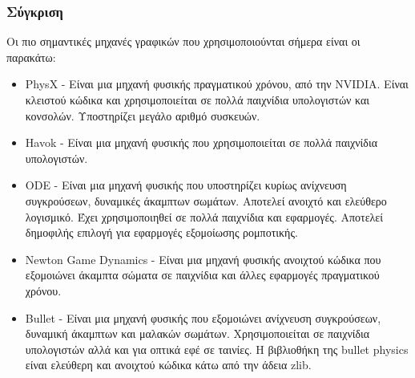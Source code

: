 \subsubsection{Σύγκριση}
Οι πιο σημαντικές μηχανές γραφικών που χρησιμοποιούνται σήμερα είναι οι παρακάτω:
\begin{itemize}
\item PhysX - Είναι μια μηχανή φυσικής πραγματικού χρόνου, από την NVIDIA. Είναι κλειστού κώδικα και χρησιμοποιείται σε πολλά παιχνίδια υπολογιστών και κονσολών. Υποστηρίζει μεγάλο αριθμό συσκευών.
\item Havok - Είναι μια μηχανή φυσικής που χρησιμοποιείται σε πολλά παιχνίδια υπολογιστών. 
\item ODE - Είναι μια μηχανή φυσικής που υποστηρίζει κυρίως ανίχνευση συγκρούσεων, δυναμικές άκαμπτων σωμάτων. Αποτελεί ανοιχτό και ελεύθερο λογισμικό. Έχει χρησιμοποιηθεί σε πολλά παιχνίδια και εφαρμογές. Αποτελεί δημοφιλής επιλογή για εφαρμογές εξομοίωσης ρομποτικής.
\item Newton Game Dynamics - Είναι μια μηχανή φυσικής ανοιχτού κώδικα που εξομοιώνει άκαμπτα σώματα σε παιχνίδια και άλλες εφαρμογές πραγματικού χρόνου. 
\item Bullet - Είναι μια μηχανή φυσικής που εξομοιώνει ανίχνευση συγκρούσεων, δυναμική άκαμπτων και μαλακών σωμάτων. Χρησιμοποιείται σε παιχνίδια υπολογιστών αλλά και για οπτικά εφέ σε ταινίες. Η βιβλιοθήκη της bullet physics είναι ελεύθερη και ανοιχτού κώδικα κάτω από την άδεια zlib.
\end{itemize}